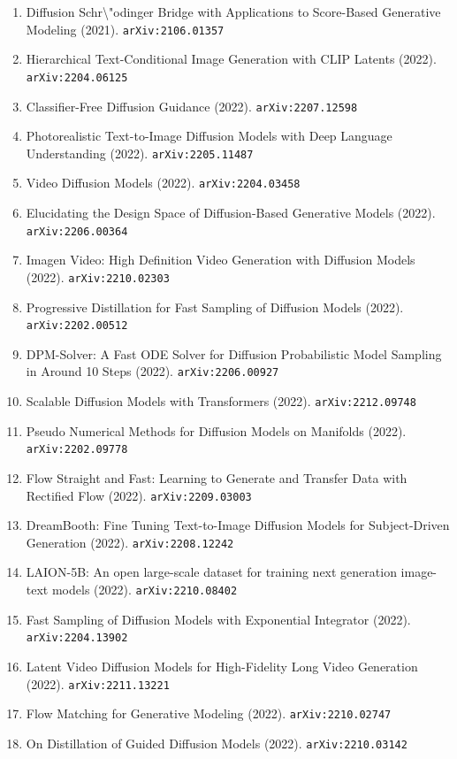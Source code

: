 \documentclass[11pt]{article}
\begin{document}
\begin{enumerate}
  \item Diffusion Schr\textbackslash{}"odinger Bridge with Applications to Score-Based
  Generative Modeling (2021). \texttt{arXiv:2106.01357}
  \item Hierarchical Text-Conditional Image Generation with CLIP Latents (2022). \texttt{arXiv:2204.06125}
  \item Classifier-Free Diffusion Guidance (2022). \texttt{arXiv:2207.12598}
  \item Photorealistic Text-to-Image Diffusion Models with Deep Language
  Understanding (2022). \texttt{arXiv:2205.11487}
  \item Video Diffusion Models (2022). \texttt{arXiv:2204.03458}
  \item Elucidating the Design Space of Diffusion-Based Generative Models (2022). \texttt{arXiv:2206.00364}
  \item Imagen Video: High Definition Video Generation with Diffusion Models (2022). \texttt{arXiv:2210.02303}
  \item Progressive Distillation for Fast Sampling of Diffusion Models (2022). \texttt{arXiv:2202.00512}
  \item DPM-Solver: A Fast ODE Solver for Diffusion Probabilistic Model Sampling
  in Around 10 Steps (2022). \texttt{arXiv:2206.00927}
  \item Scalable Diffusion Models with Transformers (2022). \texttt{arXiv:2212.09748}
  \item Pseudo Numerical Methods for Diffusion Models on Manifolds (2022). \texttt{arXiv:2202.09778}
  \item Flow Straight and Fast: Learning to Generate and Transfer Data with
  Rectified Flow (2022). \texttt{arXiv:2209.03003}
  \item DreamBooth: Fine Tuning Text-to-Image Diffusion Models for
  Subject-Driven Generation (2022). \texttt{arXiv:2208.12242}
  \item LAION-5B: An open large-scale dataset for training next generation
  image-text models (2022). \texttt{arXiv:2210.08402}
  \item Fast Sampling of Diffusion Models with Exponential Integrator (2022). \texttt{arXiv:2204.13902}
  \item Latent Video Diffusion Models for High-Fidelity Long Video Generation (2022). \texttt{arXiv:2211.13221}
  \item Flow Matching for Generative Modeling (2022). \texttt{arXiv:2210.02747}
  \item On Distillation of Guided Diffusion Models (2022). \texttt{arXiv:2210.03142}

\end{enumerate}
\end{document}
